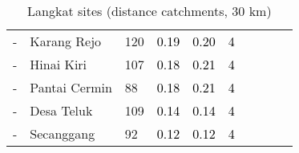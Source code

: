\begin{table}[ht]
\begin{tabular}{C{0.03\textwidth}C{0.12\textwidth}C{0.09\textwidth}C{0.08\textwidth}C{0.08\textwidth}C{0.08\textwidth}C{0.07\textwidth}C{0.07\textwidth}C{0.07\textwidth}C{0.07\textwidth}}
  {-} & Karang Rejo & 120 & \textcolor[HTML]{000000}{0.19} & \textcolor[HTML]{000000}{0.20} & \textcolor[HTML]{000000}{4} &  &  &  &  \\ 
  {-} & Hinai Kiri & 107 & \textcolor[HTML]{000000}{0.18} & \textcolor[HTML]{000000}{0.21} & \textcolor[HTML]{000000}{4} &  &  &  &  \\ 
  {-} & Pantai Cermin &  88 & \textcolor[HTML]{000000}{0.18} & \textcolor[HTML]{000000}{0.21} & \textcolor[HTML]{000000}{4} &  &  &  &  \\ 
  {-} & Desa Teluk & 109 & \textcolor[HTML]{000000}{0.14} & \textcolor[HTML]{000000}{0.14} & \textcolor[HTML]{000000}{4} &  &  &  &  \\ 
  {-} & Secanggang &  92 & \textcolor[HTML]{000000}{0.12} & \textcolor[HTML]{000000}{0.12} & \textcolor[HTML]{000000}{4} &  &  &  &  \\ 
  \end{tabular}
\endgroup
\caption{Langkat sites (distance catchments, 30 km)} 
\label{tab:langkat_dist}
\end{table}
